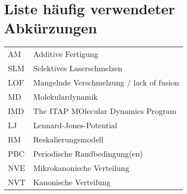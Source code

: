 \chapter{Liste häufig verwendeter Abkürzungen}
\begin{tabular}{l l}
	AM	&	Additive Fertigung\\
	SLM	&	Selektives Laserschmelzen\\
	LOF	&	Mangelnde Verschmelzung / lack of fusion\\
	MD	&	Molekulardynamik\\
	IMD	&	The ITAP MOlecular Dynamics Program\\
	LJ	&	Lennard-Jones-Potential\\
	RM	&	Reskalierungsmodell\\
	PBC	&	Periodische Randbedingung(en)\\
	NVE	&	Mikrokanonische Verteilung\\
	NVT	&	Kanonische Verteilung
\end{tabular}
